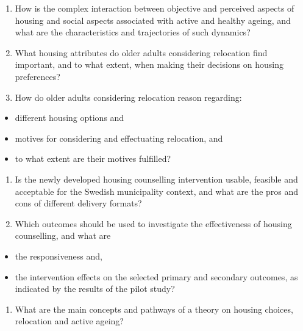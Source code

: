 \documentclass[
]{book}
\providecommand{\tightlist}{%
  \setlength{\itemsep}{0pt}\setlength{\parskip}{0pt}}
\begin{document}
\begin{enumerate}
\def\labelenumi{\arabic{enumi}.}
\setcounter{enumi}{4}
\tightlist
\item
  How is the complex interaction between objective and perceived aspects of housing and social aspects associated with active and healthy ageing, and what are the characteristics and trajectories of such dynamics?
\item
  What housing attributes do older adults considering relocation find important, and to what extent, when making their decisions on housing preferences?
\item
  How do older adults considering relocation reason regarding:
\end{enumerate}

\begin{itemize}
\tightlist
\item
  different housing options and
\item
  motives for considering and effectuating relocation, and
\item
  to what extent are their motives fulfilled?
\end{itemize}

\begin{enumerate}
\def\labelenumi{\arabic{enumi}.}
\setcounter{enumi}{7}
\tightlist
\item
  Is the newly developed housing counselling intervention usable, feasible and acceptable for the Swedish municipality context, and what are the pros and cons of different delivery formats?
\item
  Which outcomes should be used to investigate the effectiveness of housing counselling, and what are
\end{enumerate}

\begin{itemize}
\tightlist
\item
  the responsiveness and,
\item
  the intervention effects on the selected primary and secondary outcomes, as indicated by the results of the pilot study?
\end{itemize}

\begin{enumerate}
\def\labelenumi{\arabic{enumi}.}
\setcounter{enumi}{9}
\tightlist
\item
  What are the main concepts and pathways of a theory on housing choices, relocation and active ageing?
\end{enumerate}
\end{document}

